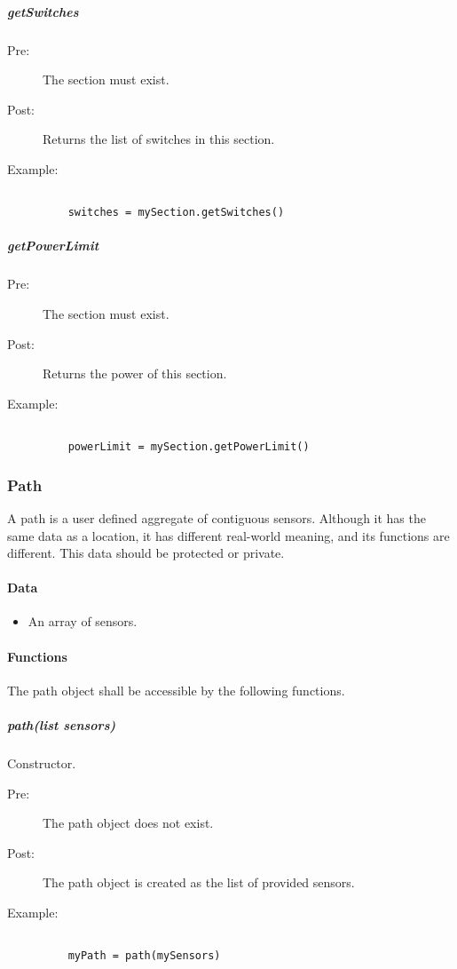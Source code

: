 \documentclass[a4paper,11pt,notitlepage]{article}
\begin{document}
\subparagraph{getSwitches}\begin{description}
\item[\hspace{1cm}Pre:] The section must exist.
\item[\hspace{1cm}Post:] Returns the list of switches in this section.
\item[\hspace{1cm}Example:]
\begin{verbatim}

    switches = mySection.getSwitches()
\end{verbatim}
\end{description}

\subparagraph{getPowerLimit}
\begin{description}
\item[\hspace{1cm}Pre:] The section must exist.
\item[\hspace{1cm}Post:] Returns the power of this section.
\item[\hspace{1cm}Example:]
\begin{verbatim}

    powerLimit = mySection.getPowerLimit()
\end{verbatim}
\end{description}

\subsubsection{Path}
A path is a user defined aggregate of contiguous sensors. Although it has the same data as a location, it has different real-world meaning, and its functions are different. This data should be protected or private.
\paragraph{Data}
\begin{itemize}
\item An array of sensors.
\end{itemize}
\paragraph{Functions}
The path object shall be accessible by the following functions.
\subparagraph{path(list sensors)} Constructor.
\begin{description}
\item[\hspace{1cm}Pre:] The path object does not exist.
\item[\hspace{1cm}Post:] The path object is created as the list of provided sensors.
\item[\hspace{1cm}Example:]
\begin{verbatim}

    myPath = path(mySensors)
\end{verbatim}
\end{description}
\end{document}
